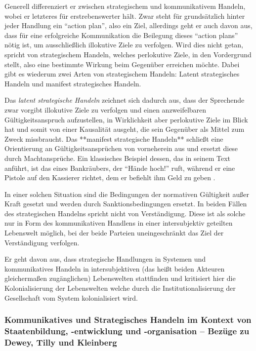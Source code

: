 {Generell differenziert er zwischen strategischem und kommunikativem Handeln, wobei er letzteres für erstrebenswerter hält.
Zwar steht für \citeauthor{Habermas-1998-aa} grundsätzlich hinter jeder Handlung ein ``action plan'', also ein Ziel, allerdings geht er auch davon aus, dass für eine erfolgreiche Kommunikation die Beilegung dieses ``action plans'' nötig ist, um ausschließlich illokutive Ziele zu verfolgen.
Wird dies nicht getan, spricht \citeauthor{Habermas-1998-aa} von strategischem Handeln, welches perlokutive Ziele, in den Vordergrund stellt, also eine bestimmte Wirkung beim Gegenüber erreichen möchte.
Dabei gibt es wiederum zwei Arten von strategischem Handeln:
Latent strategisches Handeln und manifest strategisches Handeln.

Das \emph{latent strategische Handeln} zeichnet sich dadurch aus, dass der Sprechende zwar vorgibt illokutive Ziele zu verfolgen und einen anzweifelbaren Gültigkeitsanspruch aufzustellen, in Wirklichkeit aber perlokutive Ziele im Blick hat und somit von einer Kausalität ausgeht, die sein Gegenüber als Mittel zum Zweck missbraucht.
Das **manifest strategische Handeln** schließt eine Orientierung an Gültigkeitsansprüchen von vorneherein aus und ersetzt diese durch Machtansprüche. Ein klassisches Beispiel dessen, das \citeauthor{Habermas-1998-aa} in seinem Text anführt, ist das eines Bankräubers, der ``Hände hoch!'' ruft, während er eine Pistole auf den Kassierer richtet, dem er befiehlt ihm Geld zu geben \citep[vgl.][225]{Habermas-1998-aa}.

In einer solchen Situation sind die Bedingungen der normativen Gültigkeit außer Kraft gesetzt und werden durch Sanktionsbedingungen ersetzt.
In beiden Fällen des strategischen Handelns spricht \citeauthor{Habermas-1998-aa} nicht von Verständigung.
Diese ist als solche nur in Form des kommunikativen Handlens in einer intersubjektiv geteilten Lebenswelt möglich, bei der beide Parteien uneingeschränkt das Ziel der Verständigung verfolgen.

Er geht davon aus, dass strategische Handlungen in Systemen und kommunikatives Handeln in intersubjektiven (das heißt beiden Akteuren gleichermaßen zugänglichen) Lebenswelten stattfinden und kritisiert hier die Kolonialisierung der Lebenswelten welche durch die Institutionalisierung der Gesellschaft vom System kolonialisiert wird.

\subsubsection{Kommunikatives und Strategisches Handeln im Kontext von Staatenbildung, -entwicklung und -organisation -- Bezüge zu Dewey, Tilly und Kleinberg}

}
